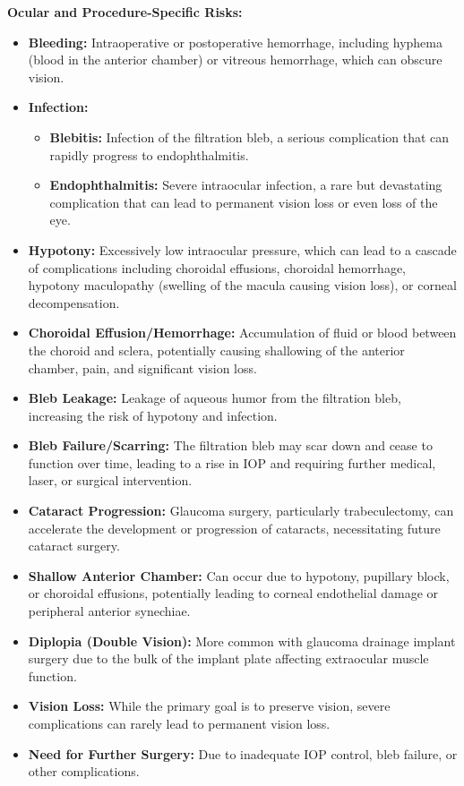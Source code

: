 \textbf{Ocular and Procedure-Specific Risks:}
\begin{itemize}
  \item \textbf{Bleeding:} Intraoperative or postoperative hemorrhage, including hyphema (blood in the anterior chamber) or vitreous hemorrhage, which can obscure vision.
  \item \textbf{Infection:}
    \begin{itemize}
      \item \textbf{Blebitis:} Infection of the filtration bleb, a serious complication that can rapidly progress to endophthalmitis.
      \item \textbf{Endophthalmitis:} Severe intraocular infection, a rare but devastating complication that can lead to permanent vision loss or even loss of the eye.
    \end{itemize}
  \item \textbf{Hypotony:} Excessively low intraocular pressure, which can lead to a cascade of complications including choroidal effusions, choroidal hemorrhage, hypotony maculopathy (swelling of the macula causing vision loss), or corneal decompensation.
  \item \textbf{Choroidal Effusion/Hemorrhage:} Accumulation of fluid or blood between the choroid and sclera, potentially causing shallowing of the anterior chamber, pain, and significant vision loss.
  \item \textbf{Bleb Leakage:} Leakage of aqueous humor from the filtration bleb, increasing the risk of hypotony and infection.
  \item \textbf{Bleb Failure/Scarring:} The filtration bleb may scar down and cease to function over time, leading to a rise in IOP and requiring further medical, laser, or surgical intervention.
  \item \textbf{Cataract Progression:} Glaucoma surgery, particularly trabeculectomy, can accelerate the development or progression of cataracts, necessitating future cataract surgery.
  \item \textbf{Shallow Anterior Chamber:} Can occur due to hypotony, pupillary block, or choroidal effusions, potentially leading to corneal endothelial damage or peripheral anterior synechiae.
  \item \textbf{Diplopia (Double Vision):} More common with glaucoma drainage implant surgery due to the bulk of the implant plate affecting extraocular muscle function.
  \item \textbf{Vision Loss:} While the primary goal is to preserve vision, severe complications can rarely lead to permanent vision loss.
  \item \textbf{Need for Further Surgery:} Due to inadequate IOP control, bleb failure, or other complications.
\end{itemize}

